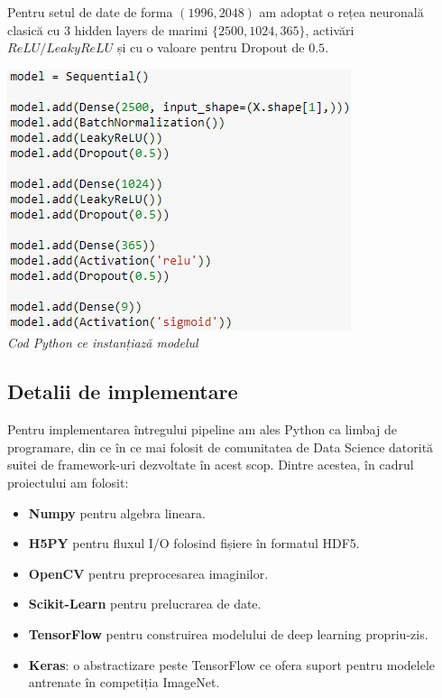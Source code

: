 \pagebreak

Pentru setul de date de forma $(1996,2048)$ am adoptat o rețea neuronală clasică cu 3 hidden layers de marimi $\{2500,1024,365\}$, activări $ReLU/LeakyReLU$ și cu o valoare pentru Dropout de $0.5$.

\begin{center}
\includegraphics[scale=1]{networkArhitecture} \\
\textit{Cod Python ce instanțiază modelul}
\end{center}

\subsection{Detalii de implementare}
Pentru implementarea întregului pipeline am ales Python ca limbaj de programare, din ce în ce mai folosit de comunitatea de Data Science datorită suitei de framework-uri dezvoltate în acest scop. Dintre acestea, în cadrul proiectului am folosit:

\begin{itemize}
\item \textbf{Numpy} pentru algebra lineara.
\item \textbf{H5PY} pentru fluxul I/O folosind fișiere în formatul HDF5.
\item \textbf{OpenCV} pentru preprocesarea imaginilor.
\item \textbf{Scikit-Learn} pentru prelucrarea de date.
\item \textbf{TensorFlow} pentru construirea modelului de deep learning propriu-zis.
\item \textbf{Keras}: o abstractizare peste TensorFlow ce ofera suport pentru modelele antrenate în competiția ImageNet.
\end{itemize}

